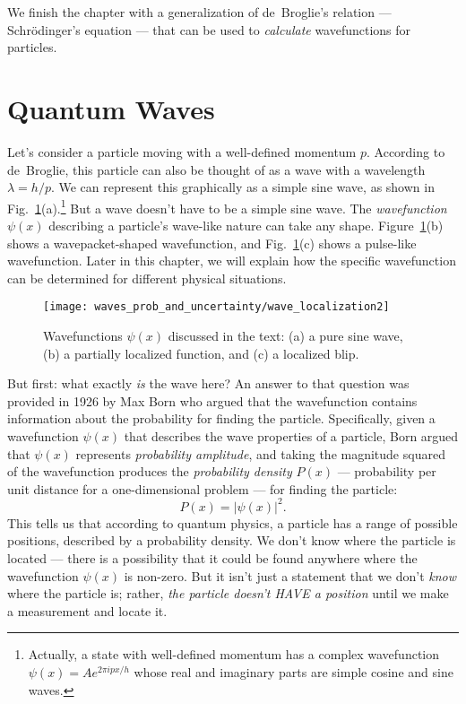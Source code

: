 We finish the chapter with a generalization of de~Broglie's relation --- 
Schr\"odinger's equation --- that can be used to \textit{calculate} 
wavefunctions for particles.

\section{Quantum Waves}

Let's consider a particle moving with a well-defined momentum
$p$. According to de~Broglie, this particle can also be
thought of as a wave with a wavelength $\lambda = h/p$. We can
represent this graphically as a simple sine wave, as shown in
Fig.~\ref{fig:wave_localization}(a).\footnote{Actually, a state with
well-defined momentum has a complex wavefunction $\psi(x) = Ae^{2\pi
ipx/h}$ whose real and imaginary parts are simple cosine and sine waves.}
But a wave doesn't have to be a simple sine wave. The {\it wavefunction}
$\psi(x)$ describing a particle's wave-like nature can take any shape.
Figure~\ref{fig:wave_localization}(b) shows a wavepacket-shaped
wavefunction, and Fig.~\ref{fig:wave_localization}(c) shows a pulse-like
wavefunction. Later in this chapter, we will explain how the specific
wavefunction can be determined for different physical situations.

\begin{figure}
\begin{center}
\texttt{[image: waves\_prob\_and\_uncertainty/wave\_localization2]}
\caption{Wavefunctions $\psi(x)$ discussed in the text: (a) a pure
sine wave, (b) a partially localized function, and (c) a localized blip.}
\label{fig:wave_localization}
\end{center}
\end{figure}

But first: what exactly {\it is} the wave here? An answer to that
question was provided in 1926 by Max Born who argued that the wavefunction
contains information about the probability for finding the particle.
Specifically, given a wavefunction $\psi(x)$ that describes the
wave properties of a particle, Born argued that $\psi(x)$ represents
\textit{probability amplitude}, and taking the magnitude squared of
the wavefunction produces the \textit{probability density} $P(x)$ ---
probability per unit distance for a one-dimensional problem --- for
finding the particle:
\begin{equation}
P(x) = |\psi(x)|^2.
\label{eq:probdensity}
\end{equation}
This tells us that according to quantum physics, a particle has a range
of possible positions, described by a probability density. We don't know
where the particle is located --- there is a possibility that it could
be found anywhere where the wavefunction $\psi(x)$ is non-zero. But it
isn't just a statement that we don't {\it know} where the particle is;
rather, {\it the particle doesn't HAVE a position} until we make a
measurement and locate it.

